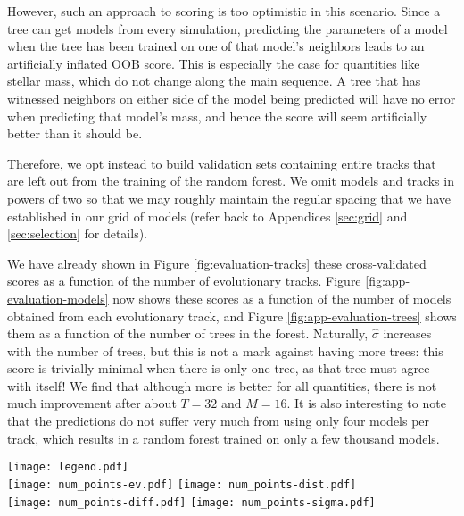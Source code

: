 \documentclass[manuscript,linenumbers]{aastex6}
\newif\ifref
\newcommand{\mb}[1]{\ifref\boldmath\textbf{#1}\unboldmath\else #1\fi}
\begin{document}
However, such an approach to scoring is too optimistic in this scenario. Since a tree can get models from every simulation, predicting the \mb{parameters} of a model when the tree has been trained on one of that model's neighbors leads to an artificially inflated OOB score. This is especially the case for quantities like stellar mass, which do not change along the main sequence. A tree that has witnessed neighbors on either side of the model being predicted will have no error when predicting that model's mass, and hence the score will seem artificially better than it should be. 

Therefore, we opt instead to build validation sets containing entire tracks that are left out from the training of the random forest. We omit models and tracks in powers of two so that we may roughly maintain the regular spacing that we have established in our grid of models (refer back to Appendices \ref{sec:grid} and \ref{sec:selection} for details). 

We have already shown in Figure \ref{fig:evaluation-tracks} these cross-validated scores as a function of the number of evolutionary tracks. Figure \ref{fig:app-evaluation-models} now shows these scores as a function of the number of models obtained from each evolutionary track, and Figure \ref{fig:app-evaluation-trees} shows them as a function of the number of trees in the forest. Naturally, $\hat\sigma$ increases with the number of trees, but this is not a mark against having more trees: this score is trivially minimal when there is only one tree, as that tree must agree with itself! We find that although more is better for all quantities,  there is not much improvement after about $T=32$ and $M=16$. It is also interesting to note that the predictions do not suffer very much from using only four models per track, which results in a random forest trained on only a few thousand models. 

\begin{figure*}
    \centering
    \texttt{[image: legend.pdf]}\\
    \texttt{[image: num\_points-ev.pdf]}%
    \texttt{[image: num\_points-dist.pdf]}\\
    \texttt{[image: num\_points-diff.pdf]}%
    \texttt{[image: num\_points-sigma.pdf]}\\
    \caption{%
    Explained variance (top left), accuracy per precision distance (top right), normalized absolute error (bottom left), and normalized standard deviation of predictions (bottom right) for each stellar parameter as a function of the number of models per evolutionary track.} 
    \label{fig:app-evaluation-models}
\end{figure*}
\end{document}
